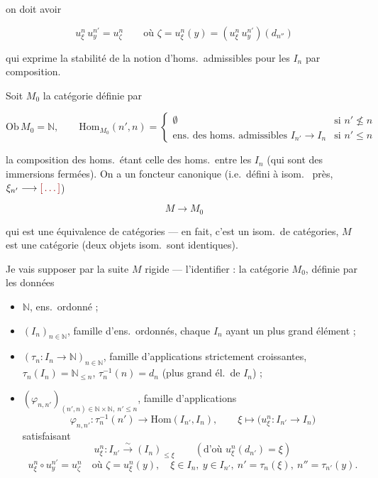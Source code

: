 \documentclass[11pt,a4paper]{article}
\begin{document}
on doit avoir

\[
u_\xi^n\, u_y^{n'} = u_\zeta^n
\qquad \text{où } \zeta = u_\xi^n(y) = (u_\xi^n\, u_y^{n'})(d_{n''})
\]

qui exprime la  stabilité de la notion d'homs.\
admissibles pour les $I_n$ par composition.

 Soit $M_0$ la catégorie définie par

\[
\mathrm{Ob}\,M_0 = \mathbb{N},
\qquad
\mathrm{Hom}_{M_0}(n', n) =
\begin{cases}
\emptyset & \text{si } n' \nleq n \\
\text{ens.\ des homs.\ admissibles } I_{n'} \to I_n & \text{si } n' \leq n
\end{cases}
\]


la composition des  homs.\ étant celle des homs.\ entre les $I_n$
(qui sont des immersions fermées). On a un foncteur canonique (i.e.\ défini à
\add{un} isom.\ \ill{} près, $\xi_{n'} \longrightarrow \ill{}$)

\[
M \longrightarrow M_0
\]

qui est une équivalence de catégories --- en fait, c'est un isom.\ de
catégories, \struck{\ill{}} $M$ est une catégorie \uncertain{rigide} (deux
objets isom.\ sont identiques).

Je vais supposer par la suite $M$ rigide --- 
l'identifier : la catégorie $M_0$, définie par les données

\begin{itemize}
\item $\mathbb{N}$, ens.\ ordonné ;
\item $(I_n)_{n \in \mathbb{N}}$, famille d'ens.\ ordonnés, chaque $I_n$ ayant
un plus grand élément ;
\item $(\tau_n : I_n \to \mathbb{N})_{n \in \mathbb{N}}$, famille
d'applications strictement croissantes, $\tau_n(I_n) = \mathbb{N}_{\leq n}$,
$\tau_n^{-1}(n) = d_n$ (plus grand él.\ de $I_n$) ;
\item $(\varphi_{n,n'})_{(n',n) \in \mathbb{N} \times \mathbb{N},\ n' \leq n}$,
famille d'applications
\[
\varphi_{n,n'} : \tau_n^{-1}(n') \longrightarrow \mathrm{Hom}(I_{n'}, I_n),
\qquad \xi \longmapsto \bigl( u_\xi^n : I_{n'} \to I_n \bigr)
\]
satisfaisant
\[
u_\xi^n : I_{n'} \overset{\sim}{\longrightarrow} (I_n)_{\leq \xi}
\qquad (\text{d'où } u_\xi^n(d_{n'}) = \xi)
\]
\[
u_\xi^n \circ u_y^{n'} = u_\zeta^n
\quad \text{où } \zeta = u_\xi^n(y),
\quad \xi \in I_n,\ y \in I_{n'},\ n' = \tau_n(\xi),\ n'' = \tau_{n'}(y).
\]
\end{itemize}
\end{document}
